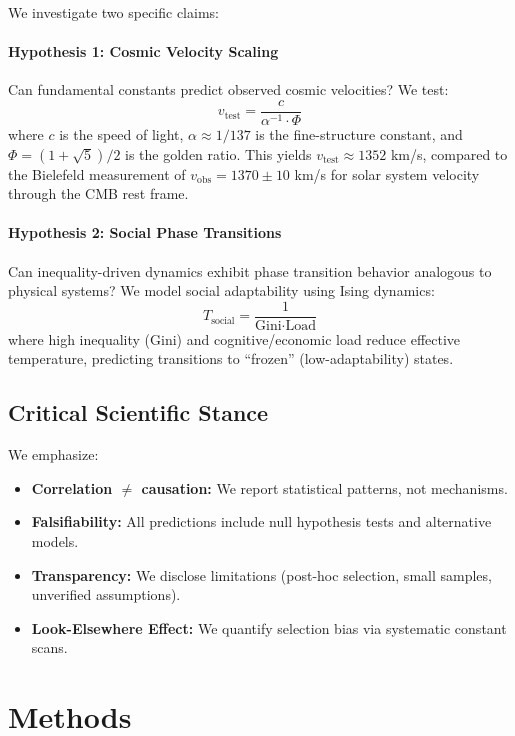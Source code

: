 \documentclass[11pt,twocolumn]{article}
\newcommand{\Gini}{\text{Gini}}
\newcommand{\vtest}{v_{\text{test}}}
\newcommand{\vobs}{v_{\text{obs}}}
\begin{document}
We investigate two specific claims:

\paragraph{Hypothesis 1: Cosmic Velocity Scaling}
Can fundamental constants predict observed cosmic velocities? We test:
\begin{equation}
\vtest = \frac{c}{\alpha^{-1} \cdot \Phi}
\end{equation}
where $c$ is the speed of light, $\alpha \approx 1/137$ is the fine-structure constant, and $\Phi = (1+\sqrt{5})/2$ is the golden ratio. This yields $\vtest \approx 1352$ km/s, compared to the Bielefeld measurement \cite{boehme2021} of $\vobs = 1370 \pm 10$ km/s for solar system velocity through the CMB rest frame.

\paragraph{Hypothesis 2: Social Phase Transitions}
Can inequality-driven dynamics exhibit phase transition behavior analogous to physical systems? We model social adaptability using Ising dynamics:
\begin{equation}
T_{\text{social}} = \frac{1}{\Gini \cdot \text{Load}}
\end{equation}
where high inequality ($\Gini$) and cognitive/economic load reduce effective temperature, predicting transitions to ``frozen'' (low-adaptability) states.

\subsection{Critical Scientific Stance}

We emphasize:
\begin{itemize}
    \item \textbf{Correlation $\neq$ causation:} We report statistical patterns, not mechanisms.
    \item \textbf{Falsifiability:} All predictions include null hypothesis tests and alternative models.
    \item \textbf{Transparency:} We disclose limitations (post-hoc selection, small samples, unverified assumptions).
    \item \textbf{Look-Elsewhere Effect:} We quantify selection bias via systematic constant scans.
\end{itemize}

\section{Methods}
\end{document}
